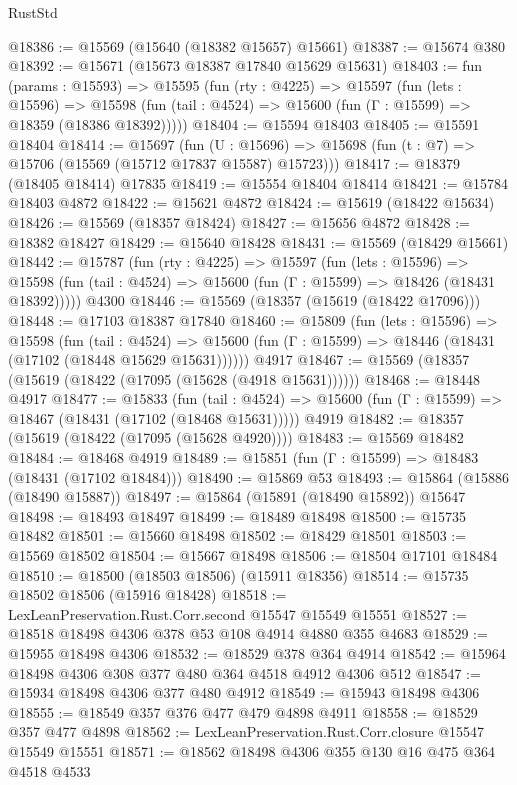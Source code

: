 \begin{lexlean}{RustStd}
\begin{coremodule}
@18386 := @15569 (@15640 (@18382 @15657) @15661)
@18387 := @15674 @380
@18392 := @15671 (@15673 @18387 @17840 @15629 @15631)
@18403 := fun (params : @15593) =>
  @15595
    (fun (rty : @4225) =>
    @15597
      (fun (lets : @15596) =>
      @15598 (fun (tail : @4524) => @15600 (fun (Γ : @15599) => @18359 (@18386 @18392)))))
@18404 := @15594 @18403
@18405 := @15591 @18404
@18414 := @15697
    (fun (U : @15696) => @15698 (fun (t : @7) => @15706 (@15569 (@15712 @17837 @15587) @15723)))
@18417 := @18379 (@18405 @18414) @17835
@18419 := @15554 @18404 @18414
@18421 := @15784 @18403 @4872
@18422 := @15621 @4872
@18424 := @15619 (@18422 @15634)
@18426 := @15569 (@18357 @18424)
@18427 := @15656 @4872
@18428 := @18382 @18427
@18429 := @15640 @18428
@18431 := @15569 (@18429 @15661)
@18442 := @15787
    (fun (rty : @4225) =>
    @15597
      (fun (lets : @15596) =>
      @15598 (fun (tail : @4524) => @15600 (fun (Γ : @15599) => @18426 (@18431 @18392)))))
    @4300
@18446 := @15569 (@18357 (@15619 (@18422 @17096)))
@18448 := @17103 @18387 @17840
@18460 := @15809
    (fun (lets : @15596) =>
    @15598
      (fun (tail : @4524) =>
      @15600 (fun (Γ : @15599) => @18446 (@18431 (@17102 (@18448 @15629 @15631))))))
    @4917
@18467 := @15569 (@18357 (@15619 (@18422 (@17095 (@15628 (@4918 @15631))))))
@18468 := @18448 @4917
@18477 := @15833
    (fun (tail : @4524) => @15600 (fun (Γ : @15599) => @18467 (@18431 (@17102 (@18468 @15631)))))
    @4919
@18482 := @18357 (@15619 (@18422 (@17095 (@15628 @4920))))
@18483 := @15569 @18482
@18484 := @18468 @4919
@18489 := @15851 (fun (Γ : @15599) => @18483 (@18431 (@17102 @18484)))
@18490 := @15869 @53
@18493 := @15864 (@15886 (@18490 @15887))
@18497 := @15864 (@15891 (@18490 @15892)) @15647
@18498 := @18493 @18497
@18499 := @18489 @18498
@18500 := @15735 @18482
@18501 := @15660 @18498
@18502 := @18429 @18501
@18503 := @15569 @18502
@18504 := @15667 @18498
@18506 := @18504 @17101 @18484
@18510 := @18500 (@18503 @18506) (@15911 @18356)
@18514 := @15735 @18502 @18506 (@15916 @18428)
@18518 := LexLeanPreservation.Rust.Corr.second @15547 @15549 @15551
@18527 := @18518 @18498 @4306 @378 @53 @108 @4914 @4880 @355 @4683
@18529 := @15955 @18498 @4306
@18532 := @18529 @378 @364 @4914
@18542 := @15964 @18498 @4306 @308 @377 @480 @364 @4518 @4912 @4306 @512
@18547 := @15934 @18498 @4306 @377 @480 @4912
@18549 := @15943 @18498 @4306
@18555 := @18549 @357 @376 @477 @479 @4898 @4911
@18558 := @18529 @357 @477 @4898
@18562 := LexLeanPreservation.Rust.Corr.closure @15547 @15549 @15551
@18571 := @18562 @18498 @4306 @355 @130 @16 @475 @364 @4518 @4533

\end{coremodule}
\end{lexlean}
